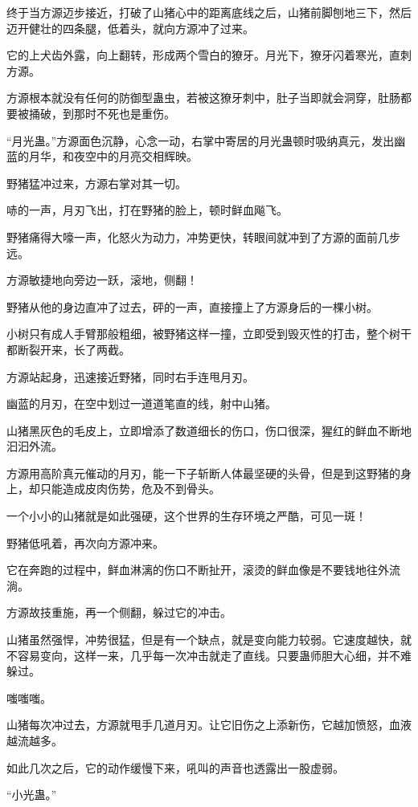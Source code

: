 \begin{this_body}
终于当方源迈步接近，打破了山猪心中的距离底线之后，山猪前脚刨地三下，然后迈开健壮的四条腿，低着头，就向方源冲了过来。

它的上犬齿外露，向上翻转，形成两个雪白的獠牙。月光下，獠牙闪着寒光，直刺方源。

方源根本就没有任何的防御型蛊虫，若被这獠牙刺中，肚子当即就会洞穿，肚肠都要被捅破，到那时不死也是重伤。

“月光蛊。”方源面色沉静，心念一动，右掌中寄居的月光蛊顿时吸纳真元，发出幽蓝的月华，和夜空中的月亮交相辉映。

野猪猛冲过来，方源右掌对其一切。

哧的一声，月刃飞出，打在野猪的脸上，顿时鲜血飚飞。

野猪痛得大嚎一声，化怒火为动力，冲势更快，转眼间就冲到了方源的面前几步远。

方源敏捷地向旁边一跃，滚地，侧翻！

野猪从他的身边直冲了过去，砰的一声，直接撞上了方源身后的一棵小树。

小树只有成人手臂那般粗细，被野猪这样一撞，立即受到毁灭性的打击，整个树干都断裂开来，长了两截。

方源站起身，迅速接近野猪，同时右手连甩月刃。

幽蓝的月刃，在空中划过一道道笔直的线，射中山猪。

山猪黑灰色的毛皮上，立即增添了数道细长的伤口，伤口很深，猩红的鲜血不断地汩汩外流。

方源用高阶真元催动的月刃，能一下子斩断人体最坚硬的头骨，但是到这野猪的身上，却只能造成皮肉伤势，危及不到骨头。

一个小小的山猪就是如此强硬，这个世界的生存环境之严酷，可见一斑！

野猪低吼着，再次向方源冲来。

它在奔跑的过程中，鲜血淋漓的伤口不断扯开，滚烫的鲜血像是不要钱地往外流淌。

方源故技重施，再一个侧翻，躲过它的冲击。

山猪虽然强悍，冲势很猛，但是有一个缺点，就是变向能力较弱。它速度越快，就不容易变向，这样一来，几乎每一次冲击就走了直线。只要蛊师胆大心细，并不难躲过。

嗤嗤嗤。

山猪每次冲过去，方源就甩手几道月刃。让它旧伤之上添新伤，它越加愤怒，血液越流越多。

如此几次之后，它的动作缓慢下来，吼叫的声音也透露出一股虚弱。

“小光蛊。”


\end{this_body}
